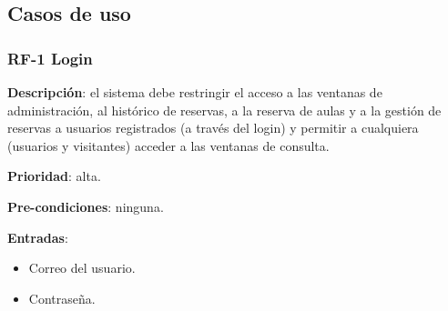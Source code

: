 \subsection{Casos de uso}

\subsubsection{RF-1 Login}

\textbf{Descripción}: el sistema debe restringir el acceso a las ventanas de administración, al histórico de reservas, a la reserva de aulas y a la gestión de reservas a usuarios registrados (a través del login) y permitir a cualquiera (usuarios y visitantes) acceder a las ventanas de consulta.

\textbf{Prioridad}: alta.

\textbf{Pre-condiciones}: ninguna.

\textbf{Entradas}:
    \begin{itemize}
    \tightlist
        \item Correo del usuario.
        \item Contraseña.
    \end{itemize}


